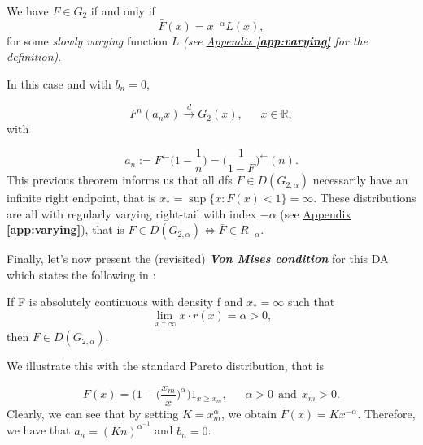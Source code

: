 \begin{theorem}
We have $F \in G_{2}$ if and only if 
\begin{equation}
\bar{F}(x)=x^{-\alpha} L(x),
\end{equation}
for some \emph{slowly varying} function $L$ \emph{(see \hyperref[app:varying]{Appendix \textbf{\ref{app:varying}}} for the definition)}. 
\end{theorem}

In this case and with $b_n=0$,

\begin{equation*}
F^n(a_nx)\stackrel{d}{\to} G_2(x), \ \ \ \ \ \ \  x\in\mathbb{R},
\end{equation*}
with

\begin{equation*}
a_n:=F^{\leftarrow}\Big(1-\frac{1}{n}\Big)=\Big(\frac{1}{1-F}\Big)^{\leftarrow}(n).
\end{equation*}
This previous theorem informs us that all dfs $F\in D(G_{2,\alpha})$ necessarily have an infinite right endpoint, that is $x_*=\sup\{x:F(x)<1\}=\infty$. These distributions are all with regularly varying right-tail with index $-\alpha$ (see \hyperref[app:varying]{Appendix \textbf{\ref{app:varying}}}), that is $F\in D(G_{2,\alpha})\Longleftrightarrow \bar{F}\in R_{-\alpha}$.



Finally, let's now present the (revisited) \emph{\textbf{Von Mises condition}} for this DA which states the following in \cite{falk_von_1993}:

\begin{theorem}
If F is absolutely continuous with density f and $x_*=\infty$ such that 
\begin{equation*}
\displaystyle{\lim_{ \ x \uparrow \infty}} x \cdot r(x)=\alpha>0,
\end{equation*}
then $F\in D(G_{2,\alpha})$.
\end{theorem}
We illustrate this with the standard Pareto distribution, that is 

\begin{equation*}
F(x)=\bigg(1-\big(\frac{x_m}{x}\big)^{\alpha}\bigg)1_{x\geq x_m}, \ \ \ \ \ \ \ \alpha>0 \  \ \text{and} \ \ x_m>0.
\end{equation*}
Clearly, we can see that by setting $K=x_m^{\alpha}$, we obtain $\bar{F}(x)=Kx^{-\alpha}$.
Therefore, we have that $a_n=(Kn)^{\alpha^{-1}}$ and $b_n=0$.

